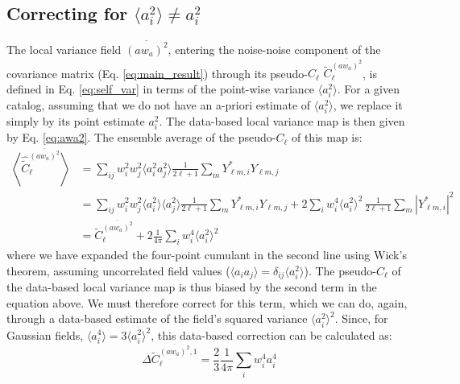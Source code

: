 \documentclass[aps,twocolumn, superscriptaddress, english, nofootinbib, 10pt]{revtex4-2}
\begin{document}
  \subsection{Correcting for $\langle a_i^2\rangle\neq a_i^2$}
    The local variance field $\overline{(aw_a)^2}$, entering the noise-noise component of the covariance matrix (Eq. \ref{eq:main_result}) through its pseudo-$C_\ell$ $\tilde{C}_\ell^{\overline{(aw_a)^2}}$, is defined in  Eq. \ref{eq:self_var} in terms of the point-wise variance $\langle a_i^2\rangle$. For a given catalog, assuming that we do not have an a-priori estimate of $\langle a_i^2\rangle$, we replace it simply by its point estimate $a_i^2$. The data-based local variance map is then given by Eq. \ref{eq:awa2}. The ensemble average of the pseudo-$C_\ell$ of this map is:
    \begin{align}\nonumber
      \left\langle\hat{\tilde{C}}^{\overline{(aw_a)^2}}_\ell\right\rangle
      &= \sum_{ij}w_i^2w_j^2\langle a_i^2a_j^2\rangle \frac{1}{2\ell+1}\sum_mY^*_{\ell m,i}Y_{\ell m,j}\\\nonumber
      &= \sum_{ij}w_i^2w_j^2\langle a_i^2\rangle\langle a_j^2\rangle \frac{1}{2\ell+1}\sum_mY^*_{\ell m,i}Y_{\ell m,j}+2\sum_iw_i^4\langle a_i^2\rangle^2\,\frac{1}{2\ell+1}\sum_m|Y^*_{\ell m,i}|^2\\\label{eq:pcl_var_corr1}
      &=\tilde{C}^{\overline{(aw_a)^2}}_\ell+2\frac{1}{4\pi}\sum_iw_i^4\langle a_i^2\rangle^2
    \end{align}
    where we have expanded the four-point cumulant in the second line using Wick's theorem, assuming uncorrelated field values ($\langle a_ia_j\rangle=\delta_{ij}\langle a_i^2\rangle$). The pseudo-$C_\ell$ of the data-based local variance map is thus biased by the second term in the equation above. We must therefore correct for this term, which we can do, again, through a data-based estimate of the field's squared variance $\langle a^2_i\rangle^2$. Since, for Gaussian fields, $\langle a_i^4\rangle=3\langle a_i^2\rangle^2$, this data-based correction can be calculated as:
    \begin{equation}
      \Delta\tilde{C}^{\overline{(aw_a)^2},1}_\ell=\frac{2}{3}\frac{1}{4\pi}\sum_iw_i^4a_i^4
    \end{equation}
\end{document}
